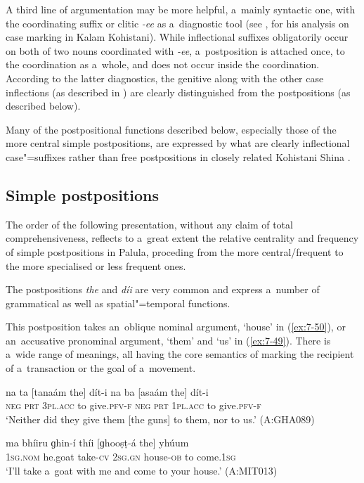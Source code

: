 A third line of argumentation may be more helpful, a~mainly syntactic one, with the coordinating suffix or clitic \textit{-ee} as a~diagnostic tool (see \citealt[77]{baart1999a}, for his analysis on case marking in Kalam Kohistani). While inflectional suffixes obligatorily occur on both of two nouns coordinated with \textit{-ee}, a~postposition is attached once, to the coordination as a~whole, and does not occur inside the coordination. According to the latter diagnostics, the genitive along with the other case inflections (as described in ) are clearly distinguished from the postpositions (as described below). 


Many of the postpositional functions described below, especially those of the more central simple postpositions, are expressed by what are clearly inflectional case"=suffixes rather than free postpositions in closely related Kohistani Shina \citep[115--130]{schmidtkohistani2001}. 


\subsection{Simple postpositions}
\label{subsec:7-2-2}

The order of the following presentation, without any claim of total comprehensiveness, reflects to a~great extent the relative centrality and frequency of simple postpositions in Palula, proceding from the more central/frequent to the more specialised or less frequent ones. 


The postpositions \textit{the} and \textit{díi} are very common and express a~number of grammatical as well as spatial"=temporal functions. 


 This postposition takes an~oblique nominal argument, `house' in (\ref{ex:7-50}), or an~accusative pronominal argument, `them' and `us' in (\ref{ex:7-49}). There is a~wide range of meanings, all having the core semantics of marking the recipient of a~transaction or the goal of a~movement. 
\begin{exe}
\ex
\label{ex:7-49}
\gll na ta [tanaám the] dít-i na ba  [asaám the] dít-i \\
\textsc{neg} \textsc{prt} \textsc{3pl.acc} to give.\textsc{pfv-f} \textsc{neg} \textsc{prt} \textsc{1pl.acc} to give.\textsc{pfv-f} \\
\glt `Neither did they give them [the guns] to them, nor to us.' (A:GHA089)
\end{exe}
\begin{exe}
\ex
\label{ex:7-50}
\gll ma bhíiru ɡhin-í thíi [ɡhooṣṭ-á the] yhúum \\
\textsc{1sg.nom} he.goat take-\textsc{cv} \textsc{2sg.gn} house-\textsc{ob} to come.\textsc{1sg} \\
\glt `I'll take a~goat with me and come to your house.' (A:MIT013)
\end{exe}

